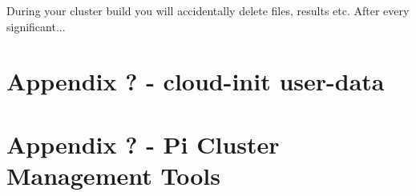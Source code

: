 \documentclass{article}
\begin{document}
During your cluster build you will accidentally delete files, results etc. After every significant...


%
%
\clearpage\section{Appendix ? - cloud-init user-data}




%
%
\clearpage\section{Appendix ? - Pi Cluster Management Tools}











%
%
\end{document}
